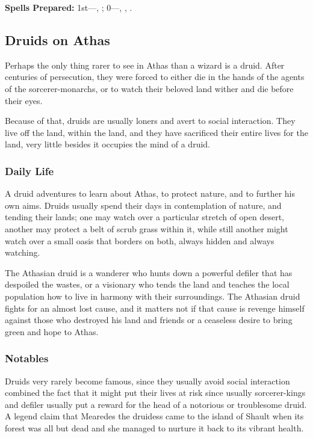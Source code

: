 
\textbf{Spells Prepared:} 1st---, ; 0---, , .


\subsection{Druids on Athas}

Perhaps the only thing rarer to see in Athas than a wizard is a druid. After centuries of persecution, they were forced to either die in the hands of the agents of the sorcerer-monarchs, or to watch their beloved land wither and die before their eyes.

Because of that, druids are usually loners and avert to social interaction. They live off the land, within the land, and they have sacrificed their entire lives for the land, very little besides it occupies the mind of a druid.

\subsubsection{Daily Life}
A druid adventures to learn about Athas, to protect nature, and to further his own aims. Druids usually spend their days in contemplation of nature, and tending their lands; one may watch over a particular stretch of open desert, another may protect a belt of scrub grass within it, while still another might watch over a small oasis that borders on both, always hidden and always watching.

The Athasian druid is a wanderer who hunts down a powerful defiler that has despoiled the wastes, or a visionary who tends the land and teaches the local population how to live in harmony with their surroundings. The Athasian druid fights for an almost lost cause, and it matters not if that cause is revenge himself against those who destroyed his land and friends or a ceaseless desire to bring green and hope to Athas.

\subsubsection{Notables}
Druids very rarely become famous, since they usually avoid social interaction combined the fact that it might put their lives at risk since usually sorcerer-kings and defiler usually put a reward for the head of a notorious or troublesome druid. A legend claim that Mearedes the druidess came to the island of Shault when its forest was all but dead and she managed to nurture it back to its vibrant health.

